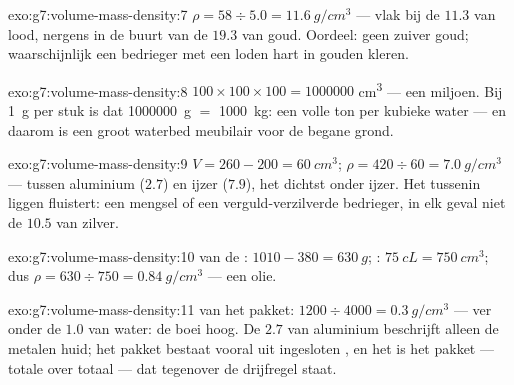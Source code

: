 \begin{solution}{exo:g7:volume-mass-density:7}
$\rho = 58 \div 5.0 = \qty{11.6}{g/cm^3}$ --- vlak bij de $11.3$ van
lood, nergens in de buurt van de $19.3$ van goud. Oordeel: geen zuiver
goud; waarschijnlijk een bedrieger met een loden hart in gouden kleren.
\end{solution}

\begin{solution}{exo:g7:volume-mass-density:8}
$100 \times 100 \times 100 = 1000000$ \unit{cm^3} --- een miljoen. Bij
\qty{1}{g} per stuk is dat \qty{1000000}{g} $=$ \qty{1000}{kg}: een
volle ton per kubieke  water --- en daarom is een groot waterbed
meubilair voor de begane grond.
\end{solution}

\begin{solution}{exo:g7:volume-mass-density:9}
$V = 260 - 200 = \qty{60}{cm^3}$;
$\rho = 420 \div 60 = \qty{7.0}{g/cm^3}$ --- tussen aluminium ($2.7$)
en ijzer ($7.9$), het dichtst onder ijzer. Het tussenin liggen
fluistert: een mengsel of een verguld-verzilverde bedrieger, in elk
geval niet de $10.5$ van zilver.
\end{solution}

\begin{solution}{exo:g7:volume-mass-density:10}
 van de : $1010 - 380 = \qty{630}{g}$;
: $\qty{75}{cL} = \qty{750}{cm^3}$; dus
$\rho = 630 \div 750 = \qty{0.84}{g/cm^3}$ --- een olie.
\end{solution}

\begin{solution}{exo:g7:volume-mass-density:11}
 van het pakket: $1200 \div 4000 = \qty{0.3}{g/cm^3}$ ---
ver onder de $1.0$ van water: de boei  hoog. De $2.7$ van
aluminium beschrijft alleen de metalen huid; het pakket bestaat vooral
uit ingesloten , en het is het pakket --- totale  over
totaal  --- dat tegenover de drijfregel staat.
\end{solution}


